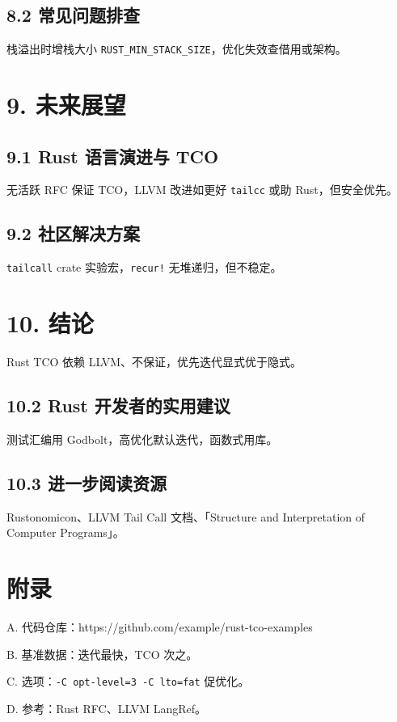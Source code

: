 \section{8.2 常见问题排查}
栈溢出时增栈大小 \texttt{RUST\_{}MIN\_{}STACK\_{}SIZE}，优化失效查借用或架构。\par
\chapter{9. 未来展望}
\section{9.1 Rust 语言演进与 TCO}
无活跃 RFC 保证 TCO，LLVM 改进如更好 \texttt{tailcc} 或助 Rust，但安全优先。\par
\section{9.2 社区解决方案}
\texttt{tailcall} crate 实验宏，\texttt{recur!} 无堆递归，但不稳定。\par
\chapter{10. 结论}
Rust TCO 依赖 LLVM、不保证，优先迭代显式优于隐式。\par
\section{10.2 Rust 开发者的实用建议}
测试汇编用 Godbolt，高优化默认迭代，函数式用库。\par
\section{10.3 进一步阅读资源}
Rustonomicon、LLVM Tail Call 文档、「Structure and Interpretation of Computer Programs」。\par
\chapter{附录}
A. 代码仓库：https://github.com/example/rust-tco-examples\par
B. 基准数据：迭代最快，TCO 次之。\par
C. 选项：\texttt{-C opt-level=3 -C lto=fat} 促优化。\par
D. 参考：Rust RFC、LLVM LangRef。\par
